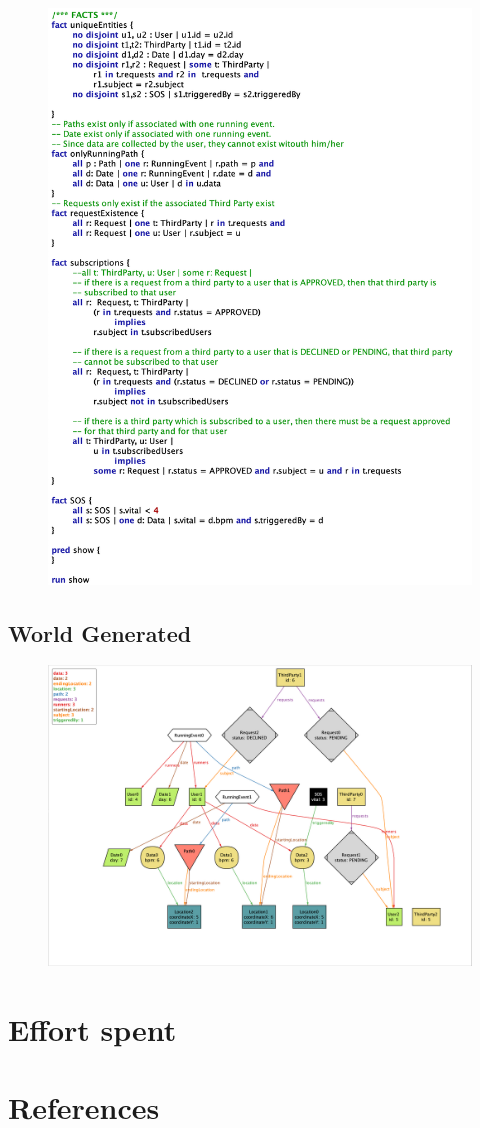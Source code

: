 \documentclass{article}
\begin{document}
\begin{figure}[h!]
  \includegraphics[width=\textwidth]{Figures/Alloy2}
\end{figure}
\newpage
\subsection{World Generated}
\begin{figure}[h!]
  \includegraphics[width=\textwidth]{Figures/AlloyWorld}
\end{figure}


\section{Effort spent}

\section{References}
\end{document}
